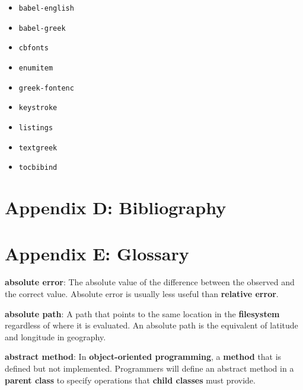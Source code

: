 \documentclass[krantzl]{krantz}
\newcommand{\glosskey}[1]{\textbf{#1}}
\begin{document}
\begin{itemize}

\item \texttt{babel-english}

\item \texttt{babel-greek}

\item \texttt{cbfonts}

\item \texttt{enumitem}

\item \texttt{greek-fontenc}

\item \texttt{keystroke}

\item \texttt{listings}

\item \texttt{textgreek}

\item \texttt{tocbibind}

\end{itemize}

\chapter{Appendix D: Bibliography}\label{bibliography}

\printbibliography[heading=none]

\chapter{Appendix E: Glossary}\label{glossary}



\noindent \textbf{\glosskey{absolute error}}: 
The absolute value of the difference between the observed and the correct value. Absolute error is usually less useful than \glosskey{relative error}.


\noindent \textbf{\glosskey{absolute path}}: 
A path that points to the same location in the \glosskey{filesystem} regardless of where it is evaluated. An absolute path is the equivalent of latitude and longitude in geography.


\noindent \textbf{\glosskey{abstract method}}: 
In \glosskey{object-oriented programming}, a \glosskey{method} that is defined but not implemented. Programmers will define an abstract method in a \glosskey{parent class} to specify operations that \glosskey{child classes} must provide.
\end{document}
